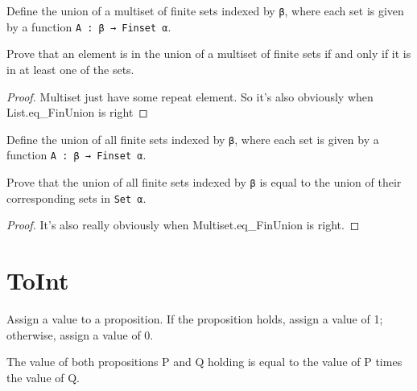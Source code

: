 \begin{definition}\label{Multiset.FinUnion}
  Define the union of a multiset of finite sets indexed by \verb|β|, where each set is given by a function \verb|A : β → Finset α|.
\end{definition}

\begin{lemma}\label{Multiset.eq_FinUnion}
  Prove that an element is in the union of a multiset of finite sets if and only if it is in at least one of the sets.
\end{lemma}

\begin{proof} 
  \leanok
  Multiset just have some repeat element. So it's also obviously when List.eq_FinUnion is right
\end{proof}

\begin{definition}\label{FinUnion₀}
  Define the union of all finite sets indexed by \verb|β|, where each set is given by a function \verb|A : β → Finset α|.
\end{definition}

\begin{lemma}\label{eq_FinUnion₀}
  Prove that the union of all finite sets indexed by \verb|β| is equal to the union of their corresponding sets in \verb|Set α|.
\end{lemma}

\begin{proof}
    \leanok
    It's also really obviously when Multiset.eq_FinUnion is right.
\end{proof}
\section{ToInt}

\begin{definition}\label{toInt}
  \leanok
  Assign a value to a proposition. If the proposition holds, assign a value of 1; otherwise, assign a value of 0.
\end{definition}

\begin{lemma}\label{toInt_and}
  \leanok
  The value of both propositions P and Q holding is equal to the value of P times the value of Q.
\end{lemma}

